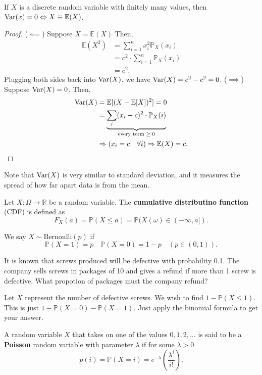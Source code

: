 \begin{prop}
	If \( X \) is a discrete random variable with finitely many values, then \( \operatorname{Var}(x) = 0 \Leftrightarrow X \equiv \mathbb{E}(X) \).
\end{prop}
\begin{proof}
	(\( \impliedby \)) Suppose \( X=\mathbb{E}(X) \) Then,
	\begin{align*}
		\mathbb{E}(X^{2} ) &= \sum_{i=1}^{n} x_{i}^{2}\mathbb{P}_X(x_i)  \\
		&= c^{2}\cdot \sum_{i=1}^{n} \mathbb{P}_X(x_i)  \\
		&= c^{2}
	.\end{align*}
	Plugging both sides back into \( \operatorname{Var}(X) \), we have \( \operatorname{Var}(X) = c^{2} - c^{2} = 0   \). (\( \implies \)) Suppose \( \operatorname{Var}(X) = 0 \). Then, 
	\begin{align*}
		\operatorname{Var}(X) &= \mathbb{E}[(X - \mathbb{E}[X] )^{2} ] = 0\\
						&= \underbrace{\sum_{i}(x_i - c)^{2} \cdot \mathbb{P}_X(i)}_{\text{every term \( \ge 0 \)}}  \\
						&\Rightarrow (x_i = c \quad \forall i) \Rightarrow \mathbb{E}(X) = c
	.\end{align*}
\end{proof}

Note that \( \operatorname{Var}(X) \) is very similar to standard deviation, and it measures the spread of how far apart data is from the mean.

\begin{definition}
	Let \( X:\Omega \to \mathbb{R} \) be a random variable. The \textbf{cumulative distributino function} (CDF) is defined as \[
		F_X(a) = \mathbb{P}(X \le a) = \mathbb{P}(X(\omega ) \in (-\infty, a])
	.\] 
\end{definition}

\begin{definition}
	We say \( X \sim \text{Bernoulli}(p) \) if \[
		\mathbb{P}(X=1) = p \quad \mathbb{P}(X=0) = 1-p \quad (p \in (0,1))
	.\] 
\end{definition}

\begin{eg}
	It is known that screws produced will be defective with probability 0.1. The company sells screws in packages of 10 and gives a refund if more than 1 screw is defective. What propotion of packages must the company refund?
\end{eg}
\begin{explanation}
	Let \( X \) represent the number of defective screws. We wish to find \( 1-\mathbb{P}(X\le 1) \). This is just \( 1 - \mathbb{P}(X=0) - \mathbb{P}(X = 1) \). Just apply the binomial formula to get your answer.
\end{explanation}

\begin{definition}
	A random variable \( X \) that takes on one of the values \(0,1,2,\ldots \) is said to be a \textbf{Poisson} random variable with parameter \( \lambda  \) if for some \( \lambda >0 \)
	\[
		p(i) = \mathbb{P}(X=i) = e^{-\lambda } \left( \frac{\lambda ^{i}}{i!}  \right) 
	.\] 
\end{definition}
